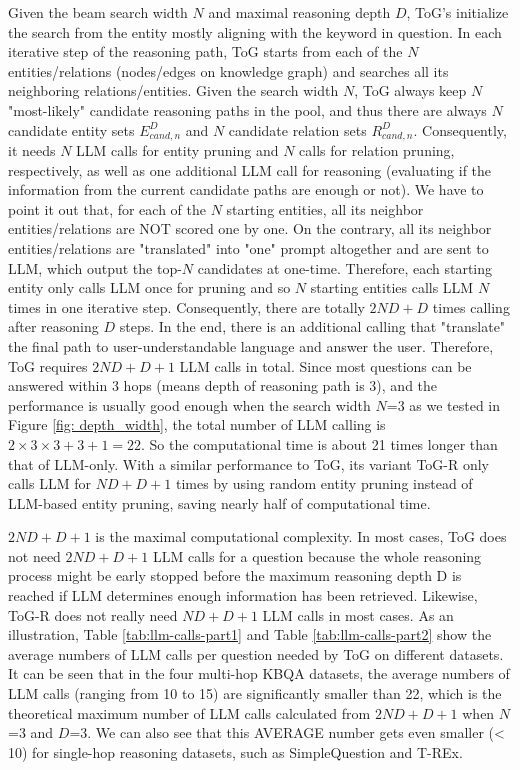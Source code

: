 \documentclass{article} %
\begin{document}
Given the beam search width $N$ and maximal reasoning depth $D$, ToG's initialize the search from the entity mostly aligning with the keyword in question. In each iterative step of the reasoning path, ToG starts from each of the $N$ entities/relations (nodes/edges on knowledge graph) and searches all its neighboring relations/entities. Given the search width $N$, ToG always keep $N$ "most-likely" candidate reasoning paths in the pool, and thus there are always $N$ candidate entity sets $E^D_{cand,n}$ and $N$ candidate relation sets $R^D_{cand,n}$. Consequently, it needs $N$ LLM calls for entity pruning and $N$ calls for relation pruning, respectively, as well as one additional LLM call for reasoning (evaluating if the information from the current candidate paths are enough or not). We have to point it out that, for each of the $N$ starting entities, all its neighbor entities/relations are NOT scored one by one. On the contrary, all its neighbor entities/relations are "translated" into "one" prompt altogether and are sent to LLM, which output the top-$N$ candidates at one-time. Therefore, each starting entity only calls LLM once for pruning and so $N$ starting entities calls LLM $N$ times in one iterative step. Consequently, there are totally $2ND+D$ times calling after reasoning $D$ steps. In the end, there is an additional calling that "translate" the final path to user-understandable language and answer the user. Therefore, ToG requires $2ND+D+1$ LLM calls in total. Since most questions can be answered within 3 hops (means depth of reasoning path is 3), and the performance is usually good enough when the search width $N$=3 as we tested in Figure \ref{fig: depth_width}, the total number of LLM calling is $2\times 3\times 3+3+1=22$. So the computational time is about 21 times longer than that of LLM-only. With a similar performance to ToG, its variant ToG-R only calls LLM for $ND+D+1$ times by using random entity pruning instead of LLM-based entity pruning, saving nearly half of computational time.

$2ND+D+1$ is the maximal computational complexity. In most cases, ToG does not need $2ND+D+1$ LLM calls for a question because the whole reasoning process might be early stopped before the maximum reasoning depth D is reached if LLM determines enough information has been retrieved. Likewise, ToG-R does not really need $ND+D+1$ LLM calls in most cases. As an illustration, Table \ref{tab:llm-calls-part1} and Table \ref{tab:llm-calls-part2} show the average numbers of LLM calls per question needed by ToG on different datasets. It can be seen that in the four multi-hop KBQA datasets, the average numbers of LLM calls (ranging from 10 to 15) are significantly smaller than 22, which is the theoretical maximum number of LLM calls calculated from $2ND+D+1$ when $N$=3 and $D$=3. We can also see that this AVERAGE number gets even smaller (< 10) for single-hop reasoning datasets, such as SimpleQuestion and T-REx.
\end{document}
